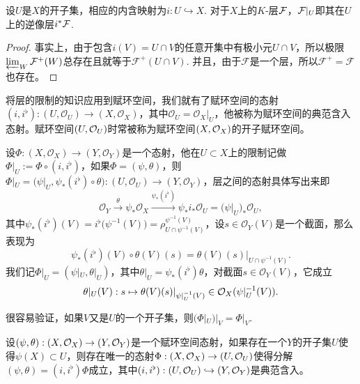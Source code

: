 
\begin{coro}
	设$U$是$X$的开子集，相应的内含映射为$i:U\hookrightarrow X$. 对于$X$上的$K$-层$\mathcal{F}$，$\mathcal{F}|_U$即其在$U$上的逆像层$i^*\mathcal{F}$. 
\end{coro}

\begin{proof}
	事实上，由于包含$i(V)=U\cap V$的任意开集中有极小元$U\cap V$，所以极限$\varprojlim_W \mathcal{F}^+(W)$总存在且就等于$\mathcal{F}^+(U\cap V)$. 并且，由于$\mathcal{F}$是一个层，所以$\mathcal{F}^+=\mathcal{F}$也存在。
\end{proof}

\begin{para}[赋环空间的典范含入态射]
将层的限制的知识应用到赋环空间，我们就有了赋环空间的态射$(i,i^\flat):(U,\mathcal{O}_U)\to (X,\mathcal{O}_X)$，其中$\mathcal{O}_U=\mathcal{O}_X|_U$，他被称为赋环空间的典范含入态射。赋环空间$(U,\mathcal{O}_U)$时常被称为赋环空间$(X,\mathcal{O}_X)$的开子赋环空间。

设$\Phi:(X,\mathcal{O}_X)\to (Y,\mathcal{O}_Y)$是一个态射，他在$U\subset X$上的限制记做$\Phi|_U:=\Phi\circ (i,i^\flat)$，如果$\Phi=(\psi,\theta)$，则$\Phi|_U=\bigl(\psi|_U, \psi_*(i^\flat) \circ \theta\bigr):(U,\mathcal{O}_U)\to (Y,\mathcal{O}_Y)$，层之间的态射具体写出来即
\[
	\mathcal{O}_Y\xrightarrow{\theta} \psi_*\mathcal{O}_X \xrightarrow{\psi_*(i^\flat)} \psi_*i_*\mathcal{O}_U=\bigl(\psi|_U\bigr)_*\mathcal{O}_U,
\]
其中$\psi_*(i^\flat)(V)=i^\flat\bigl(\psi^{-1}(V)\bigr)=\rho^{\psi^{-1}(V)}_{U\cap \psi^{-1}(V)}$，设$s\in \mathcal{O}_Y(V)$是一个截面，那么表现为
\[
	\psi_*(i^\flat)(V)\circ \theta(V)(s)=\theta(V)(s)|_{U\cap \psi^{-1}(V)}.
\]
我们记$\Phi|_U=(\psi|_U,\theta|_U)$，其中$\theta|_U=\psi_*(i^\flat)\theta$，对截面$s\in \mathcal{O}_Y(V)$，它成立
\[
	\theta|_U(V):s\mapsto \theta(V)(s)|_{\psi|_U^{-1}(V)}\in \mathcal{O}_X(\psi|_U^{-1}(V)).
\]

很容易验证，如果$V$又是$U$的一个开子集，则$(\Phi|_U)|_V=\Phi|_V$.
\end{para}

\begin{pro}\label{pro:1.20}
设$(\psi,\theta):(X,\mathcal{O}_X)\to (Y,\mathcal{O}_Y)$是一个赋环空间态射，如果存在一个$Y$的开子集$U$使得$\psi(X)\subset U$，则存在唯一的态射$\Phi:(X,\mathcal{O}_X)\to (U,\mathcal{O}_U)$使得分解$(\psi,\theta)=(i,i^\flat)\Phi$成立，其中$(i,i^\flat):(U,\mathcal{O}_U)\hookrightarrow (Y,\mathcal{O}_Y)$是典范含入。
\end{pro}

